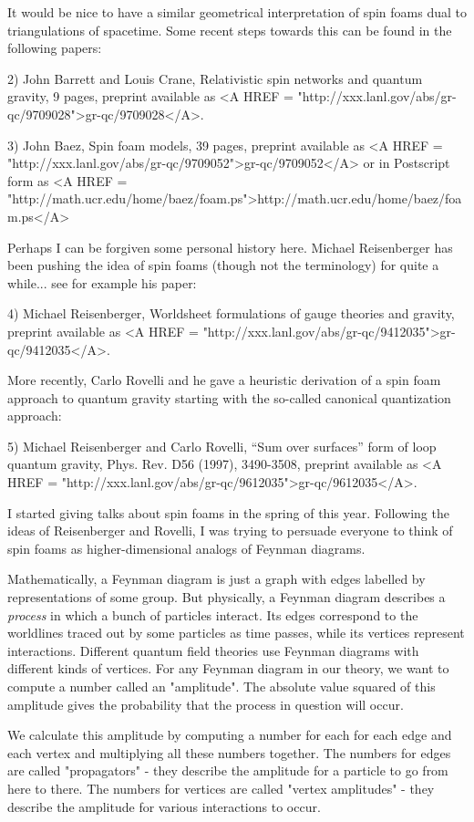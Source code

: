 It would be nice to have a similar geometrical interpretation of spin
foams dual to triangulations of spacetime.  Some recent steps towards 
this can be found in the following papers:

2) John Barrett and Louis Crane, Relativistic spin networks
and quantum gravity, 9 pages, preprint available as <A HREF = "http://xxx.lanl.gov/abs/gr-qc/9709028">gr-qc/9709028</A>.


 3) John Baez, Spin foam models, 39 pages, preprint available as <A
HREF = "http://xxx.lanl.gov/abs/gr-qc/9709052">gr-qc/9709052</A> or in
Postscript form as <A HREF = "http://math.ucr.edu/home/baez/foam.ps">http://math.ucr.edu/home/baez/foam.ps</A>

Perhaps I can be forgiven some personal history here.  Michael Reisenberger
has been pushing the idea of spin foams (though not the terminology) for
quite a while... see for example his paper:

4) Michael Reisenberger, Worldsheet formulations of gauge theories
and gravity, preprint available as <A HREF = "http://xxx.lanl.gov/abs/gr-qc/9412035">gr-qc/9412035</A>.
 
More recently, Carlo Rovelli and he gave a heuristic derivation of a spin
foam approach to quantum gravity starting with the so-called canonical
quantization approach:

5) Michael Reisenberger and Carlo Rovelli, ``Sum over surfaces''
form of loop quantum gravity, Phys. Rev. D56 (1997), 3490-3508,
preprint available as <A HREF = "http://xxx.lanl.gov/abs/gr-qc/9612035">gr-qc/9612035</A>. 

I started giving talks about spin foams in the spring of this year.  
Following the ideas of Reisenberger and Rovelli, I was trying to 
persuade everyone to think of spin foams as higher-dimensional analogs 
of Feynman diagrams.

Mathematically, a Feynman diagram is just a graph with edges labelled by
representations of some group.  But physically, a Feynman diagram
describes a \emph{process} in which a bunch of particles interact.  Its edges
correspond to the worldlines traced out by some particles as time
passes, while its vertices represent interactions.  Different quantum
field theories use Feynman diagrams with different kinds of vertices.
For any Feynman diagram in our theory, we want to compute a number
called an "amplitude".  The absolute value squared of this amplitude
gives the probability that the process in question will occur.  

We calculate this amplitude by computing a number for each for each edge
and each vertex and multiplying all these numbers together.  The numbers
for edges are called "propagators" - they describe the amplitude for a
particle to go from here to there.  The numbers for vertices are called
"vertex amplitudes" - they describe the amplitude for various
interactions to occur.

